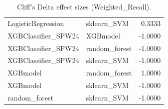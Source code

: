 \begin{table}[t]
\begin{tabular}{llr}
LogisticRegression & sklearn_SVM & 0.3333 \\
XGBClassifier_SPW24 & XGBmodel & -1.0000 \\
XGBClassifier_SPW24 & random_forest & -1.0000 \\
XGBClassifier_SPW24 & sklearn_SVM & -1.0000 \\
XGBmodel & random_forest & 1.0000 \\
XGBmodel & sklearn_SVM & -1.0000 \\
random_forest & sklearn_SVM & -1.0000 \\
\bottomrule
\end{tabular}
\caption{Cliff's Delta effect sizes (Weighted_Recall).}
\label{tab:cliffs_Weighted_Recall}
\end{table}